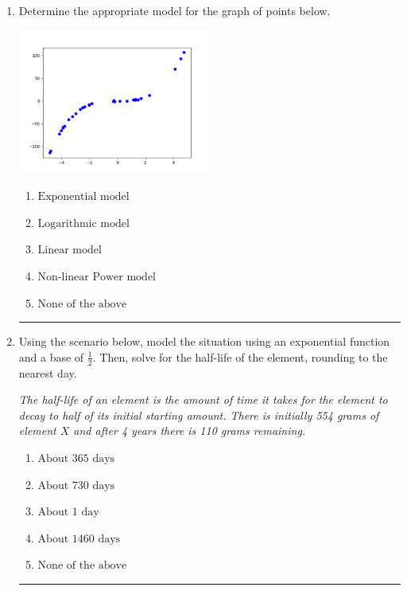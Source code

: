 \documentclass[14pt]{extbook}
\newcommand{\litem}[1]{\item#1\hspace*{-1cm}\rule{\textwidth}{0.4pt}}
\begin{document}
\begin{enumerate}
{\begin{enumerate}[label=\Alph*.]
\end{enumerate} }
\litem{
Determine the appropriate model for the graph of points below.
\begin{center}
    \includegraphics[width=0.5\textwidth]{../Figures/identifyModelGraph11CopyA.png}
\end{center}
\begin{enumerate}[label=\Alph*.]
\item \( \text{Exponential model} \)
\item \( \text{Logarithmic model} \)
\item \( \text{Linear model} \)
\item \( \text{Non-linear Power model} \)
\item \( \text{None of the above} \)

\end{enumerate} }
\litem{
Using the scenario below, model the situation using an exponential function and a base of $\frac{1}{2}$. Then, solve for the half-life of the element, rounding to the nearest day.
\begin{center}
    \textit{ The half-life of an element is the amount of time it takes for the element to decay to half of its initial starting amount. There is initially 554 grams of element $X$ and after 4 years there is 110 grams remaining. }
\end{center}
\begin{enumerate}[label=\Alph*.]
\item \( \text{About } 365 \text{ days} \)
\item \( \text{About } 730 \text{ days} \)
\item \( \text{About } 1 \text{ day} \)
\item \( \text{About } 1460 \text{ days} \)
\item \( \text{None of the above} \)


\end{enumerate}}
\end{enumerate}
\end{document}
